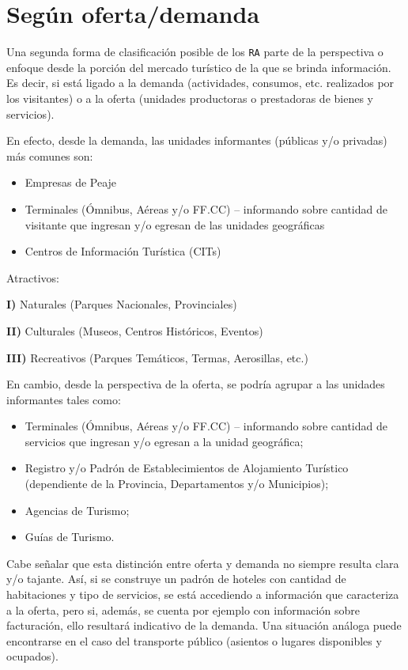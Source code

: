 \documentclass[
]{book}
\begin{document}
\hypertarget{seguxfan-ofertademanda}{%
\section{Según oferta/demanda}\label{seguxfan-ofertademanda}}

Una segunda forma de clasificación posible de los \texttt{RA} parte de la perspectiva o enfoque desde la porción del mercado turístico de la que se brinda información. Es decir, si está ligado a la demanda (actividades, consumos, etc. realizados por los visitantes) o a la oferta (unidades productoras o prestadoras de bienes y servicios).

En efecto, desde la demanda, las unidades informantes (públicas y/o privadas) más comunes son:

\begin{itemize}
\item
  Empresas de Peaje
\item
  Terminales (Ómnibus, Aéreas y/o FF.CC) -- informando sobre cantidad de visitante que ingresan y/o egresan de las unidades geográficas
\item
  Centros de Información Turística (CITs)
\end{itemize}

Atractivos:

\textbf{I)} Naturales (Parques Nacionales, Provinciales)

\textbf{II)} Culturales (Museos, Centros Históricos, Eventos)

\textbf{III)} Recreativos (Parques Temáticos, Termas, Aerosillas, etc.)

En cambio, desde la perspectiva de la oferta, se podría agrupar a las unidades informantes tales como:

\begin{itemize}
\item
  Terminales (Ómnibus, Aéreas y/o FF.CC) -- informando sobre cantidad de servicios que ingresan y/o egresan a la unidad geográfica;
\item
  Registro y/o Padrón de Establecimientos de Alojamiento Turístico (dependiente de la Provincia, Departamentos y/o Municipios);
\item
  Agencias de Turismo;
\item
  Guías de Turismo.
\end{itemize}

Cabe señalar que esta distinción entre oferta y demanda no siempre resulta clara y/o tajante. Así, si se construye un padrón de hoteles con cantidad de habitaciones y tipo de servicios, se está accediendo a información que caracteriza a la oferta, pero si, además, se cuenta por ejemplo con información sobre facturación, ello resultará indicativo de la demanda. Una situación análoga puede encontrarse en el caso del transporte público (asientos o lugares disponibles y ocupados).
\end{document}
